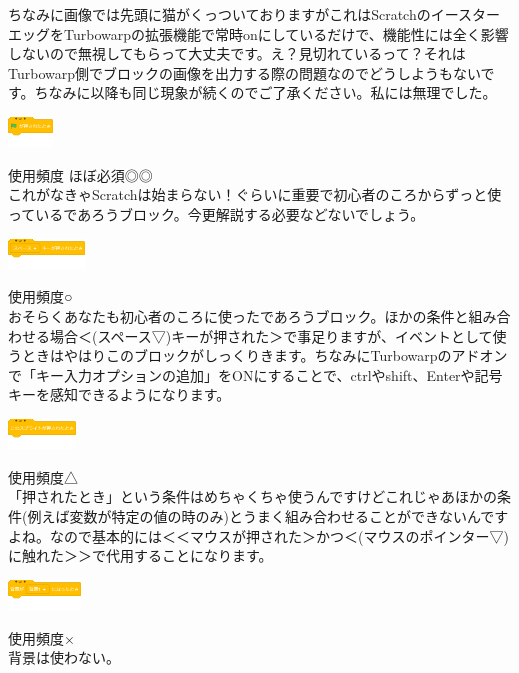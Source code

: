 \documentclass[b5paper,10pt]{jsarticle}
\begin{document}
\begin{multicols*}{3}
ちなみに画像では先頭に猫がくっついておりますがこれはScratchのイースターエッグをTurbowarpの拡張機能で常時onにしているだけで、機能性には全く影響しないので無視してもらって大丈夫です。え？見切れているって？それはTurbowarp側でブロックの画像を出力する際の問題なのでどうしようもないです。ちなみに以降も同じ現象が続くのでご了承ください。私には無理でした。

\begin{itembox}{1}
\includegraphics[height=8mm]{images/events_1.png}
\end{itembox}
使用頻度 ほぼ必須◎◎\\
これがなきゃScratchは始まらない！ぐらいに重要で初心者のころからずっと使っているであろうブロック。今更解説する必要などないでしょう。
\begin{itembox}{2}
\includegraphics[height=8mm]{images/events_2.png}
\end{itembox}
使用頻度○\\
おそらくあなたも初心者のころに使ったであろうブロック。ほかの条件と組み合わせる場合＜(スペース▽)キーが押された＞で事足りますが、イベントとして使うときはやはりこのブロックがしっくりきます。ちなみにTurbowarpのアドオンで「キー入力オプションの追加」をONにすることで、ctrlやshift、Enterや記号キーを感知できるようになります。
\begin{itembox}{3}
\includegraphics[height=8mm]{images/events_3.png}
\end{itembox}
使用頻度△\\
「押されたとき」という条件はめちゃくちゃ使うんですけどこれじゃあほかの条件(例えば変数が特定の値の時のみ)とうまく組み合わせることができないんですよね。なので基本的には＜＜マウスが押された＞かつ＜(マウスのポインター▽)に触れた＞＞で代用することになります。
\begin{itembox}{4}
\includegraphics[height=8mm]{images/events_4.png}
\end{itembox}
使用頻度×\\
背景は使わない。
\begin{itembox}{5}

\end{itembox}
\end{multicols*}
\end{document}
